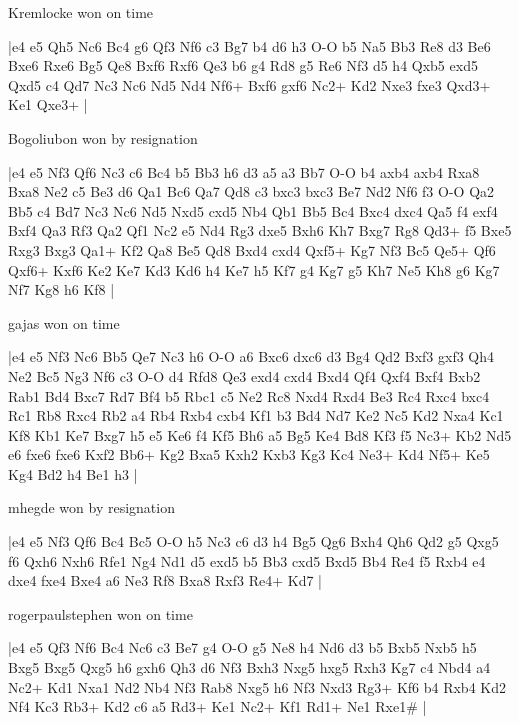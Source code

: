 \showboard

Kremlocke won on time

\makegametitle
|e4 e5 Qh5 Nc6 Bc4 g6 Qf3 Nf6 c3 Bg7 b4 d6 h3 O-O b5 Na5 Bb3 Re8 d3 Be6 Bxe6 Rxe6 Bg5 Qe8 Bxf6 Rxf6 Qe3 b6 g4 Rd8 g5 Re6 Nf3 d5 h4 Qxb5 exd5 Qxd5 c4 Qd7 Nc3 Nc6 Nd5 Nd4 Nf6+ Bxf6 gxf6 Nc2+ Kd2 Nxe3 fxe3 Qxd3+ Ke1 Qxe3+  |

\showboard

Bogoliubon won by resignation

\makegametitle
|e4 e5 Nf3 Qf6 Nc3 c6 Bc4 b5 Bb3 h6 d3 a5 a3 Bb7 O-O b4 axb4 axb4 Rxa8 Bxa8 Ne2 c5 Be3 d6 Qa1 Bc6 Qa7 Qd8 c3 bxc3 bxc3 Be7 Nd2 Nf6 f3 O-O Qa2 Bb5 c4 Bd7 Nc3 Nc6 Nd5 Nxd5 cxd5 Nb4 Qb1 Bb5 Bc4 Bxc4 dxc4 Qa5 f4 exf4 Bxf4 Qa3 Rf3 Qa2 Qf1 Nc2 e5 Nd4 Rg3 dxe5 Bxh6 Kh7 Bxg7 Rg8 Qd3+ f5 Bxe5 Rxg3 Bxg3 Qa1+ Kf2 Qa8 Be5 Qd8 Bxd4 cxd4 Qxf5+ Kg7 Nf3 Bc5 Qe5+ Qf6 Qxf6+ Kxf6 Ke2 Ke7 Kd3 Kd6 h4 Ke7 h5 Kf7 g4 Kg7 g5 Kh7 Ne5 Kh8 g6 Kg7 Nf7 Kg8 h6 Kf8  |

\showboard

gajas won on time

\makegametitle
|e4 e5 Nf3 Nc6 Bb5 Qe7 Nc3 h6 O-O a6 Bxc6 dxc6 d3 Bg4 Qd2 Bxf3 gxf3 Qh4 Ne2 Bc5 Ng3 Nf6 c3 O-O d4 Rfd8 Qe3 exd4 cxd4 Bxd4 Qf4 Qxf4 Bxf4 Bxb2 Rab1 Bd4 Bxc7 Rd7 Bf4 b5 Rbc1 c5 Ne2 Rc8 Nxd4 Rxd4 Be3 Rc4 Rxc4 bxc4 Rc1 Rb8 Rxc4 Rb2 a4 Rb4 Rxb4 cxb4 Kf1 b3 Bd4 Nd7 Ke2 Nc5 Kd2 Nxa4 Kc1 Kf8 Kb1 Ke7 Bxg7 h5 e5 Ke6 f4 Kf5 Bh6 a5 Bg5 Ke4 Bd8 Kf3 f5 Nc3+ Kb2 Nd5 e6 fxe6 fxe6 Kxf2 Bb6+ Kg2 Bxa5 Kxh2 Kxb3 Kg3 Kc4 Ne3+ Kd4 Nf5+ Ke5 Kg4 Bd2 h4 Be1 h3  |

\showboard

mhegde won by resignation

\makegametitle
|e4 e5 Nf3 Qf6 Bc4 Bc5 O-O h5 Nc3 c6 d3 h4 Bg5 Qg6 Bxh4 Qh6 Qd2 g5 Qxg5 f6 Qxh6 Nxh6 Rfe1 Ng4 Nd1 d5 exd5 b5 Bb3 cxd5 Bxd5 Bb4 Re4 f5 Rxb4 e4 dxe4 fxe4 Bxe4 a6 Ne3 Rf8 Bxa8 Rxf3 Re4+ Kd7  |

\showboard

rogerpaulstephen won on time

\makegametitle
|e4 e5 Qf3 Nf6 Bc4 Nc6 c3 Be7 g4 O-O g5 Ne8 h4 Nd6 d3 b5 Bxb5 Nxb5 h5 Bxg5 Bxg5 Qxg5 h6 gxh6 Qh3 d6 Nf3 Bxh3 Nxg5 hxg5 Rxh3 Kg7 c4 Nbd4 a4 Nc2+ Kd1 Nxa1 Nd2 Nb4 Nf3 Rab8 Nxg5 h6 Nf3 Nxd3 Rg3+ Kf6 b4 Rxb4 Kd2 Nf4 Kc3 Rb3+ Kd2 c6 a5 Rd3+ Ke1 Nc2+ Kf1 Rd1+ Ne1 Rxe1\#  |

